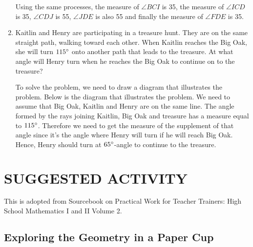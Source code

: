 \begin{enumerate}
Using the same processes, the measure of $\angle BCI$ is 35, the measure of $\angle ICD$ is 35, $\angle CDJ$ is 55, $\angle JDE$ is also 55 and finally the measure of $\angle FDE$ is 35.

\item Kaitlin and Henry are participating in a treasure hunt. They are on the same straight path,
walking toward each other. When Kaitlin reaches the Big Oak, she will turn $115\mathrm{^{\circ}}$ onto another
path that leads to the treasure. At what angle will Henry turn when he reaches the Big Oak to
continue on to the treasure?

\begin{center}
\end{center}

\Solution

To solve the problem, we need to draw a diagram that illustrates the problem. Below is
the diagram that illustrates the problem. We need to assume that Big Oak, Kaitlin and Henry are
on the same line. The angle formed by the rays joining Kaitlin, Big Oak and treasure has a
measure equal to $115\mathrm{^{\circ}}$. Therefore we need to get the measure of the supplement of that angle
since it's the angle where Henry will turn if he will reach Big Oak. Hence, Henry should turn at
$65\mathrm{^{\circ}}$-angle to continue to the treasure.
\end{enumerate}
\section*{SUGGESTED ACTIVITY}
This is adopted from Sourcebook on Practical Work for Teacher Trainers: High School Mathematics I and
II Volume 2.
\subsection*{Exploring the Geometry in a Paper Cup}
